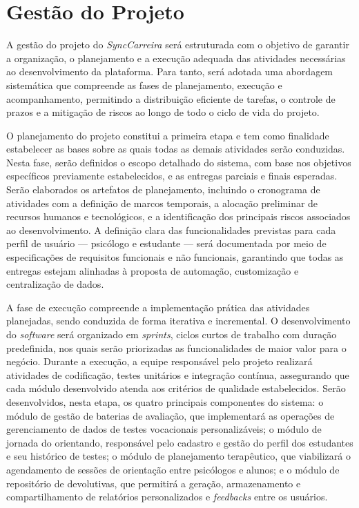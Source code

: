 \chapter{Gestão do Projeto}

A gestão do projeto do \textit{SyncCarreira} será estruturada com o objetivo de garantir a organização, o planejamento e a execução adequada das atividades necessárias ao desenvolvimento da plataforma. Para tanto, será adotada uma abordagem sistemática que compreende as fases de planejamento, execução e acompanhamento, permitindo a distribuição eficiente de tarefas, o controle de prazos e a mitigação de riscos ao longo de todo o ciclo de vida do projeto.

O planejamento do projeto constitui a primeira etapa e tem como finalidade estabelecer as bases sobre as quais todas as demais atividades serão conduzidas. Nesta fase, serão definidos o escopo detalhado do sistema, com base nos objetivos específicos previamente estabelecidos, e as entregas parciais e finais esperadas. Serão elaborados os artefatos de planejamento, incluindo o cronograma de atividades com a definição de marcos temporais, a alocação preliminar de recursos humanos e tecnológicos, e a identificação dos principais riscos associados ao desenvolvimento. A definição clara das funcionalidades previstas para cada perfil de usuário --- psicólogo e estudante --- será documentada por meio de especificações de requisitos funcionais e não funcionais, garantindo que todas as entregas estejam alinhadas à proposta de automação, customização e centralização de dados.

A fase de execução compreende a implementação prática das atividades planejadas, sendo conduzida de forma iterativa e incremental. O desenvolvimento do \textit{software} será organizado em \textit{sprints}, ciclos curtos de trabalho com duração predefinida, nos quais serão priorizadas as funcionalidades de maior valor para o negócio. Durante a execução, a equipe responsável pelo projeto realizará atividades de codificação, testes unitários e integração contínua, assegurando que cada módulo desenvolvido atenda aos critérios de qualidade estabelecidos. Serão desenvolvidos, nesta etapa, os quatro principais componentes do sistema: o módulo de gestão de baterias de avaliação, que implementará as operações de gerenciamento de dados de testes vocacionais personalizáveis; o módulo de jornada do orientando, responsável pelo cadastro e gestão do perfil dos estudantes e seu histórico de testes; o módulo de planejamento terapêutico, que viabilizará o agendamento de sessões de orientação entre psicólogos e alunos; e o módulo de repositório de devolutivas, que permitirá a geração, armazenamento e compartilhamento de relatórios personalizados e \textit{feedbacks} entre os usuários.


